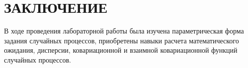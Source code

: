 \section*{ЗАКЛЮЧЕНИЕ}

В ходе проведения лабораторной работы была изучена параметрическая форма
задания случайных процессов, приобретены навыки расчета математического ожидания, дисперсии, ковариационной и взаимной ковариационной функций случайных процессов.

\newpage
